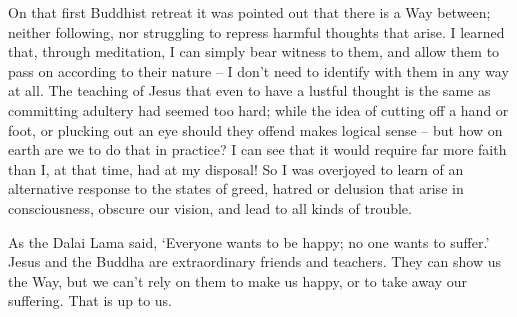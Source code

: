On that first Buddhist retreat it was pointed out that there is a Way between; neither following, nor struggling to repress harmful thoughts that arise. I learned that, through meditation, I can simply bear witness to them, and allow them to pass on according to their nature -- I don't need to identify with them in any way at all. The teaching of Jesus that even to have a lustful thought is the same as committing adultery had seemed too hard; while the idea of cutting off a hand or foot, or plucking out an eye should they offend makes logical sense -- but how on earth are we to do that in practice? I can see that it would require far more faith than I, at that time, had at my disposal! So I was overjoyed to learn of an alternative response to the states of greed, hatred or delusion that arise in consciousness, obscure our vision, and lead to all kinds of trouble.

As the Dalai Lama said, `Everyone wants to be happy; no one wants to suffer.' Jesus and the Buddha are extraordinary friends and teachers. They can show us the Way, but we can't rely on them to make us happy, or to take away our suffering. That is up to us. 
